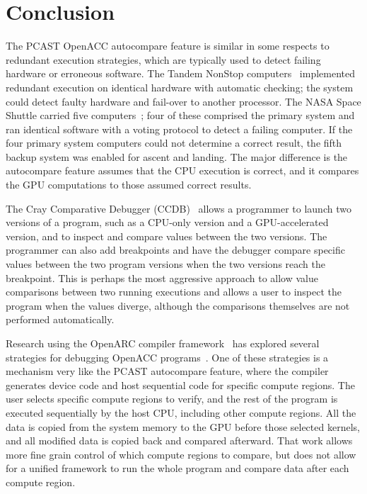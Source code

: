 \section{Conclusion}

The PCAST OpenACC autocompare feature is similar in some respects to redundant execution strategies, which are typically used to detect failing hardware or erroneous software.
The Tandem NonStop computers~\cite{bartlett.tandem.86} implemented redundant execution on identical hardware with automatic checking; the system could detect faulty hardware and fail-over to another processor.
The NASA Space Shuttle carried five computers~\cite{fraser.astro.74}; four of these comprised the primary system and ran identical software with a voting protocol to detect a failing computer.
If the four primary system computers could not determine a correct result, the fifth backup system was enabled for ascent and landing.
The major difference is the autocompare feature assumes that the CPU execution is correct, and it compares the GPU computations to those assumed correct results.

The Cray Comparative Debugger (CCDB)~\cite{derose.sc.15} allows a programmer to launch two versions of a program, such as a CPU-only version and a GPU-accelerated version, and to inspect and compare values between the two versions.
The programmer can also add breakpoints and have the debugger compare specific values between the two program versions when the two versions reach the breakpoint.
This is perhaps the most aggressive approach to allow value comparisons between two running executions and allows a user to inspect the program when the values diverge, although the comparisons themselves are not performed automatically.

Research using the OpenARC compiler framework~\cite{lee.hpdc.14} has explored several strategies for debugging OpenACC programs~\cite{lee.ipdps.14}.
One of these strategies is a mechanism very like the PCAST autocompare feature, where the compiler generates device code and host sequential code for specific compute regions.
The user selects specific compute regions to verify, and the rest of the program is executed sequentially by the host CPU, including other compute regions.
All the data is copied from the system memory to the GPU before those selected kernels, and all modified data is copied back and compared afterward.
That work allows more fine grain control of which compute regions to compare, but does not allow for a unified framework to run the whole program and compare data after each compute region.

